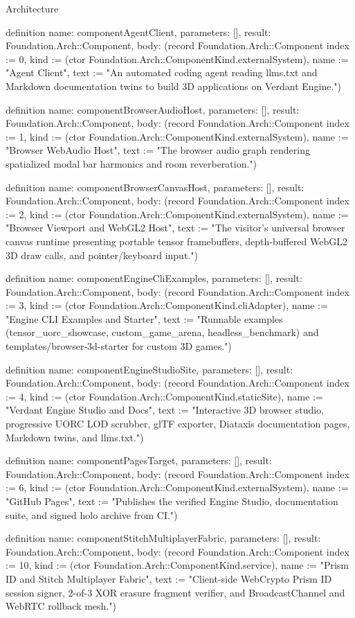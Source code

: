 \begin{lexlean}{Architecture}
\begin{semanticmodule}
definition{
  name: componentAgentClient,
  parameters: [],
  result: Foundation.Arch::Component,
  body: (record Foundation.Arch::Component {index := 0, kind := (ctor Foundation.Arch::ComponentKind.externalSystem), name := "Agent Client", text := "An automated coding agent reading llms.txt and Markdown documentation twins to build 3D applications on Verdant Engine."})
}

definition{
  name: componentBrowserAudioHost,
  parameters: [],
  result: Foundation.Arch::Component,
  body: (record Foundation.Arch::Component {index := 1, kind := (ctor Foundation.Arch::ComponentKind.externalSystem), name := "Browser WebAudio Host", text := "The browser audio graph rendering spatialized modal bar harmonics and room reverberation."})
}

definition{
  name: componentBrowserCanvasHost,
  parameters: [],
  result: Foundation.Arch::Component,
  body: (record Foundation.Arch::Component {index := 2, kind := (ctor Foundation.Arch::ComponentKind.externalSystem), name := "Browser Viewport and WebGL2 Host", text := "The visitor's universal browser canvas runtime presenting portable tensor framebuffers, depth-buffered WebGL2 3D draw calls, and pointer/keyboard input."})
}

definition{
  name: componentEngineCliExamples,
  parameters: [],
  result: Foundation.Arch::Component,
  body: (record Foundation.Arch::Component {index := 3, kind := (ctor Foundation.Arch::ComponentKind.cliAdapter), name := "Engine CLI Examples and Starter", text := "Runnable examples (tensor_uorc_showcase, custom_game_arena, headless_benchmark) and templates/browser-3d-starter for custom 3D games."})
}

definition{
  name: componentEngineStudioSite,
  parameters: [],
  result: Foundation.Arch::Component,
  body: (record Foundation.Arch::Component {index := 4, kind := (ctor Foundation.Arch::ComponentKind.staticSite), name := "Verdant Engine Studio and Docs", text := "Interactive 3D browser studio, progressive UORC LOD scrubber, glTF exporter, Diataxis documentation pages, Markdown twins, and llms.txt."})
}

definition{
  name: componentPagesTarget,
  parameters: [],
  result: Foundation.Arch::Component,
  body: (record Foundation.Arch::Component {index := 6, kind := (ctor Foundation.Arch::ComponentKind.externalSystem), name := "GitHub Pages", text := "Publishes the verified Engine Studio, documentation suite, and signed holo archive from CI."})
}

definition{
  name: componentStitchMultiplayerFabric,
  parameters: [],
  result: Foundation.Arch::Component,
  body: (record Foundation.Arch::Component {index := 10, kind := (ctor Foundation.Arch::ComponentKind.service), name := "Prism ID and Stitch Multiplayer Fabric", text := "Client-side WebCrypto Prism ID session signer, 2-of-3 XOR erasure fragment verifier, and BroadcastChannel and WebRTC rollback mesh."})
}


\end{semanticmodule}
\end{lexlean}
